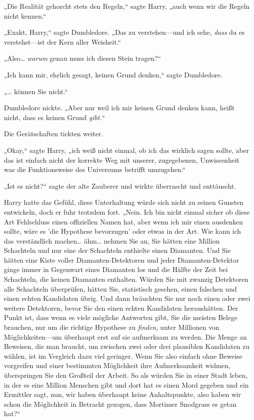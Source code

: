 {„Die Realität gehorcht stets den Regeln,“ sagte Harry, „auch wenn wir die Regeln nicht kennen.“

„Exakt, Harry,“ sagte Dumbledore. „Das zu verstehen—und ich sehe, \emph{dass} du es verstehst—ist der Kern aller Weisheit.“

„Also… \emph{warum} genau muss ich diesen Stein tragen?“

„Ich kann mir, ehrlich gesagt, keinen Grund denken,“ sagte Dumbledore.

„… können Sie nicht.“

Dumbledore nickte. „Aber nur weil ich mir keinen Grund denken kann, heißt nicht, dass es keinen Grund \emph{gibt.}“

Die Gerätschaften tickten weiter.

„Okay,“ sagte Harry, „ich weiß nicht einmal, ob ich das wirklich sagen sollte, aber das ist einfach nicht der korrekte Weg mit unserer, zugegebenen, Unwissenheit was die Funktionsweise des Universums betrifft umzugehen.“

„Ist es nicht?“ sagte der alte Zauberer und wirkte überrascht und enttäuscht.

Harry hatte das Gefühl, diese Unterhaltung würde sich nicht zu seinen Gunsten entwickeln, doch er fuhr trotzdem fort. „Nein. Ich bin nicht einmal sicher ob diese Art Fehlschluss einen offiziellen Namen hat, aber wenn ich mir einen ausdenken sollte, wäre es 'die Hypothese bevorzugen' oder etwas in der Art. Wie kann ich das verständlich machen… ähm… nehmen Sie an, Sie hätten eine Million Schachteln und nur eine der Schachteln enthielte einen Diamanten. Und Sie hätten eine Kiste voller Diamanten-Detektoren und jeder Diamanten-Detektor ginge immer in Gegenwart eines Diamanten los und die Hälfte der Zeit bei Schachteln, die keinen Diamanten enthalten. Würden Sie mit zwanzig Detektoren alle Schachteln überprüfen, hätten Sie, statistisch gesehen, einen falschen und einen echten Kandidaten übrig. Und dann bräuchten Sie nur noch einen oder zwei weitere Detektoren, bevor Sie den einen echten Kandidaten heraushätten. Der Punkt ist, dass wenn es viele mögliche Antworten gibt, Sie die meisten Belege brauchen, nur um die richtige Hypothese zu \emph{finden}, unter Millionen von Möglichkeiten—um überhaupt erst auf sie aufmerksam zu werden. Die Menge an Beweisen, die man braucht, um zwischen zwei oder drei plausiblen Kandidaten zu wählen, ist im Vergleich dazu viel geringer. Wenn Sie also einfach ohne Beweise vorgreifen und einer bestimmten Möglichkeit ihre Aufmerksamkeit widmen, überspringen Sie den Großteil der Arbeit. So als würden Sie in einer Stadt leben, in der es eine Million Menschen gibt und dort hat es einen Mord gegeben und ein Ermittler sagt, nun, wir haben überhaupt keine Anhaltspunkte, also haben wir schon die Möglichkeit in Betracht gezogen, dass Mortimer Snodgrass es getan hat?“

}

